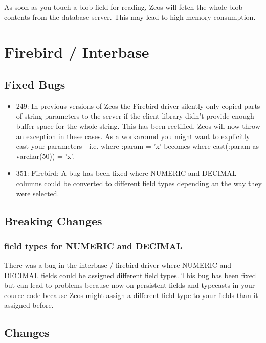 \documentclass[a4paper,12pt,oneside]{book}
\begin{document}
As soon as you touch a blob field for reading, Zeos will fetch the whole blob contents from the database server.
This may lead to high memory consumption.

\section{Firebird / Interbase}
\label{sec:Rev6_FirebirdInterbase}

\subsection{Fixed Bugs}
\label{sec:Rev6_FirebirdInterbase_FixedBugs}

\begin{itemize}
\item 
  249: In previous versions of Zeos the Firebird driver silently only copied parts of string parameters to the server if the client library didn't provide enough buffer space for the whole string.
	This has been rectified.
	Zeos will now throw an exception in these cases.
	As a workaround you might want to explicitly cast your parameters - i.e. where :param = 'x' becomes where cast(:param as varchar(50)) = 'x'.
\item
  351: Firebird: A bug has been fixed where NUMERIC and DECIMAL columns could be converted to different field types depending an the way they were selected.
\end{itemize}

\subsection{Breaking Changes}
\label{sec:Rev6_FirebirdInterbase_BreakingChanges}

\subsubsection{field types for NUMERIC and DECIMAL}
\label{sec:Rev6_FirebirdInterbase_BreakingChanges_FieldTypesNumericDecimal}

There was a bug in the interbase / firebird driver where NUMERIC and DECIMAL fields could be assigned different field types.
This bug has been fixed but can lead to problems because now on persistent fields and typecasts in your cource code because Zeos might assign a different field type to your fields than it assigned before.

\subsection{Changes}
\label{sec:Rev6_FirebirdInterbase_Changes}
\end{document}
